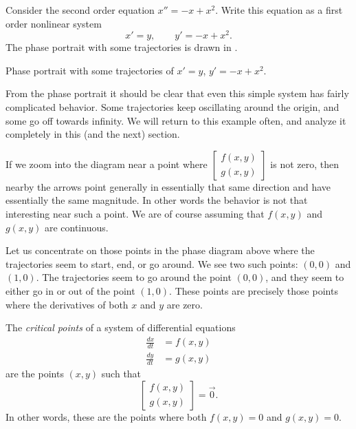 \begin{example} \label{example:nlin-1b-example}
Consider the second order equation $x''=-x+x^2$.
Write this equation as a first order nonlinear system
\begin{equation*}
x' = y , \qquad y' = -x+x^2 .
\end{equation*}
The phase portrait with some trajectories is drawn in
.
\begin{myfig}
\capstart
{}
\caption{Phase portrait with some trajectories of
$x' = y$, $y' = -x+x^2$. \label{fig:nlin-1b}}
\end{myfig}

From the phase portrait it should be clear that even this simple system has
fairly complicated behavior.  Some trajectories keep oscillating around the
origin, and some go off towards infinity.  We will return to this example
often, and analyze it completely in this (and the next) section.
\end{example}

If we zoom into the diagram near a point where 
$\left[ \begin{smallmatrix} f(x,y) \\ g(x,y) \end{smallmatrix} \right]$ is
not zero, then nearby the arrows point generally in essentially that same
direction and have essentially the same magnitude.
In other words the behavior is not that interesting near such a point.
We are of course assuming that $f(x,y)$ and $g(x,y)$ are continuous.

Let us concentrate on those points in the phase diagram
above where the trajectories
seem to start, end, or go around.  We see two such points:
$(0,0)$ and $(1,0)$.  The trajectories seem to go around the point $(0,0)$,
and they seem to either go in or out of the point $(1,0)$.
%
These points are precisely those points where the derivatives of both $x$
and $y$ are zero.  

\begin{definition} The \emph{critical points} of a system of differential equations
\begin{equation*}
\begin{split}
\frac{dx}{dt} &= f(x,y) \\
\frac{dy}{dt} &= g(x,y)
\end{split}
\end{equation*}
are the points $(x,y)$ such that
\begin{equation*} 
\begin{bmatrix} f(x,y) \\ g(x,y) \end{bmatrix} = \vec{0} .
\end{equation*}
In other words, these are the points where both $f(x,y)=0$ and $g(x,y)=0$.
\end{definition}

